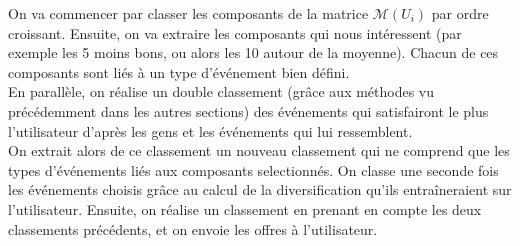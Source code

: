\documentclass[11pt, oneside]{article}
\begin{document}
On va commencer par classer les composants de la matrice $\mathcal{M} (U_i)$ par ordre croissant. Ensuite, on va extraire les composants qui nous intéressent (par exemple les 5 moins bons, ou alors les 10 autour de la moyenne). Chacun de ces composants sont liés à un type d'événement bien défini. \\

En parallèle, on réalise un double classement (grâce aux méthodes vu précédemment dans les autres sections) des événements qui satisfairont le plus l'utilisateur d'après les gens et les événements qui lui ressemblent. \\

On extrait alors de ce classement un nouveau classement qui ne comprend que les types d'événements liés aux composants selectionnés. On classe une seconde fois les événements choisis grâce au calcul de la diversification qu'ils entraîneraient sur l'utilisateur. Ensuite, on réalise un classement en prenant en compte les deux classements précédents, et on envoie les offres à l'utilisateur.  \\ 
\end{document}
